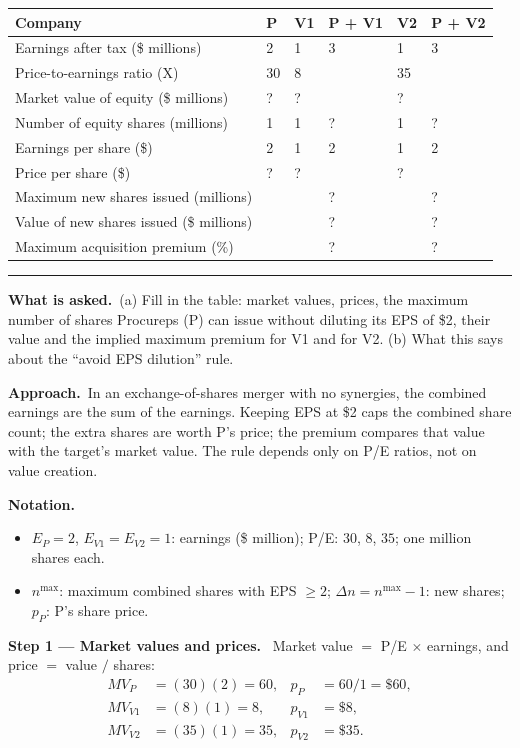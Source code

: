 \documentclass[11pt,a4paper]{article}
\newcommand{\notation}{\par\noindent\textbf{Notation.}}
\newcommand{\step}[2]{\par\medskip\noindent\textbf{Step #1 --- #2.}~}
\newcommand{\asked}{\par\medskip\noindent\textbf{What is asked.}~}
\newcommand{\approach}{\par\smallskip\noindent\textbf{Approach.}~}
\newcommand{\stmtend}{\par\endgroup\nopagebreak\noindent\rule{\linewidth}{0.4pt}\par\medskip}
\begin{document}
{\def\LTcaptype{none} %
\begin{longtable}[]{@{}llllll@{}}
\toprule\noalign{}
Company & P & V1 & P + V1 & V2 & P + V2 \\
\midrule\noalign{}
\endhead
\bottomrule\noalign{}
\endlastfoot
Earnings after tax (\$ millions) & 2 & 1 & 3 & 1 & 3 \\
Price-to-earnings ratio (X) & 30 & 8 & & 35 & \\
Market value of equity (\$ millions) & ? & ? & & ? & \\
Number of equity shares (millions) & 1 & 1 & ? & 1 & ? \\
Earnings per share (\$) & 2 & 1 & 2 & 1 & 2 \\
Price per share (\$) & ? & ? & & ? & \\
Maximum new shares issued (millions) & & & ? & & ? \\
Value of new shares issued (\$ millions) & & & ? & & ? \\
Maximum acquisition premium (\%) & & & ? & & ? \\
\end{longtable}
}
\stmtend

\asked (a) Fill in the table: market values, prices, the maximum number of shares Procureps (P) can
issue without diluting its EPS of \$2, their value and the implied maximum premium for V1 and for V2.
(b) What this says about the ``avoid EPS dilution'' rule.

\approach In an exchange-of-shares merger with no synergies, the combined earnings are the sum of the
earnings. Keeping EPS at \$2 caps the combined share count; the extra shares are worth P's price; the
premium compares that value with the target's market value. The rule depends only on P/E ratios, not on
value creation.

\notation
\begin{itemize}
  \item $E_P=2$, $E_{V1}=E_{V2}=1$: earnings (\$ million); P/E: $30$, $8$, $35$; one million shares each.
  \item $n^{\max}$: maximum combined shares with EPS $\ge 2$; $\Delta n=n^{\max}-1$: new shares; $p_P$: P's share price.
\end{itemize}

\step{1}{Market values and prices} Market value $=$ P/E $\times$ earnings, and price $=$ value $/$ shares:
\begin{align}
  MV_P &= (30)(2)=60, & p_P&=60/1=\$60, \nonumber\\
  MV_{V1} &= (8)(1)=8, & p_{V1}&=\$8, \nonumber\\
  MV_{V2} &= (35)(1)=35, & p_{V2}&=\$35. \nonumber
\end{align}
\end{document}

